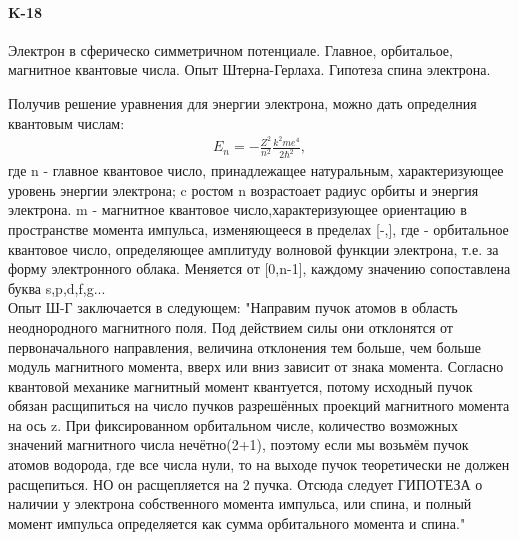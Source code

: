 \documentclass[__main__.tex]{subfiles}
\begin{document}
\paragraph{K-18}
Электрон в сферическо симметричном потенциале. Главное, орбитальое, магнитное квантовые числа. Опыт Штерна-Герлаха. Гипотеза спина электрона.

Получив решение уравнения для энергии электрона, можно дать определния квантовым числам:
\begin{gather*}
	E_n  = -\frac{Z^2}{n^2}\frac{k^2me^4}{2\hbar^2},
\end{gather*}
где n - главное квантовое число, принадлежащее натуральным, характеризующее уровень энергии электрона; c ростом n возрастоает радиус орбиты и энергия электрона.
m - магнитное квантовое число,характеризующее ориентацию в пространстве момента импульса, изменяющееся в пределах [-\eta,\eta], где
 \eta - орбитальное квантовое число, определяющее амплитуду волновой функции электрона, т.е. за форму электронного облака. Меняется от [0,n-1], каждому значению сопоставлена буква s,p,d,f,g...
 \\
 Опыт Ш-Г заключается в следующем:
 "Направим пучок атомов в область неоднородного магнитного поля. Под действием силы они отклонятся от первоначального направления, величина отклонения тем больше, чем больше модуль магнитного момента, вверх или вниз зависит от знака момента. Согласно квантовой механике магнитный момент квантуется, потому исходный пучок обязан расщипиться на число пучков разрешённых проекций магнитного момента на ось z. При фиксированном орбитальном числе, количество возможных значений магнитного числа нечётно(2\eta +1),  поэтому если мы возьмём пучок атомов водорода, где все числа нули, то на выходе пучок теоретически не должен расщепиться. НО он расщепляется на 2 пучка. Отсюда следует ГИПОТЕЗА о наличии у электрона собственного момента импульса, или спина, и полный момент импульса определяется как сумма орбитального момента и спина."
\end{document}
